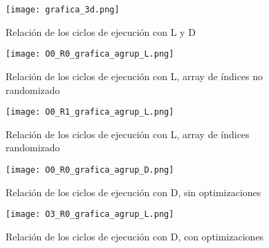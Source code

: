 \documentclass[a4paper,twocolumn]{article}
\begin{document}
    \begin{figure}[!ht]
        \centering
        \texttt{[image: grafica\_3d.png]}
        \caption{Relación de los ciclos de ejecución con L y D}
        \label{Figura3}
    \end{figure}
    
    \begin{figure}[!ht]
        \centering
        \texttt{[image: O0\_R0\_grafica\_agrup\_L.png]}
        \caption{Relación de los ciclos de ejecución con L, array de índices no randomizado}
        \label{Figura4}
    \end{figure}
    
    \begin{figure}[!ht]
        \centering
        \texttt{[image: O0\_R1\_grafica\_agrup\_L.png]}
        \caption{Relación de los ciclos de ejecución con L, array de índices randomizado}
        \label{Figura5}
    \end{figure}
    
    \begin{figure}[!ht]
        \centering
        \texttt{[image: O0\_R0\_grafica\_agrup\_D.png]}
        \caption{Relación de los ciclos de ejecución con D, sin optimizaciones}
        \label{Figura6}
    \end{figure}
    
    \begin{figure}[!ht]
        \centering
        \texttt{[image: O3\_R0\_grafica\_agrup\_L.png]}
        \caption{Relación de los ciclos de ejecución con D, con optimizaciones}
        \label{Figura7}
    \end{figure}
\end{document}
